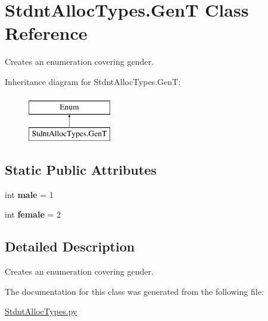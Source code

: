 \hypertarget{class_stdnt_alloc_types_1_1_gen_t}{}\section{Stdnt\+Alloc\+Types.\+GenT Class Reference}
\label{class_stdnt_alloc_types_1_1_gen_t}


Creates an enumeration covering gender.  


Inheritance diagram for Stdnt\+Alloc\+Types.\+GenT\+:\begin{figure}[H]
\begin{center}
\leavevmode
\includegraphics[height=2.000000cm]{class_stdnt_alloc_types_1_1_gen_t}
\end{center}
\end{figure}
\subsection*{Static Public Attributes}
\begin{DoxyCompactItemize}
\item 
\mbox{\label{class_stdnt_alloc_types_1_1_gen_t_a5b77316ca7d9bd45536ba8aee60c38ca}} 
int {\bfseries male} = 1
\item 
\mbox{\label{class_stdnt_alloc_types_1_1_gen_t_a5a66e845b4cfb687f41c243be4917664}} 
int {\bfseries female} = 2
\end{DoxyCompactItemize}


\subsection{Detailed Description}
Creates an enumeration covering gender. 



The documentation for this class was generated from the following file\+:\begin{DoxyCompactItemize}
\item 
\mbox{\hyperlink{_stdnt_alloc_types_8py}{Stdnt\+Alloc\+Types.\+py}}\end{DoxyCompactItemize}
